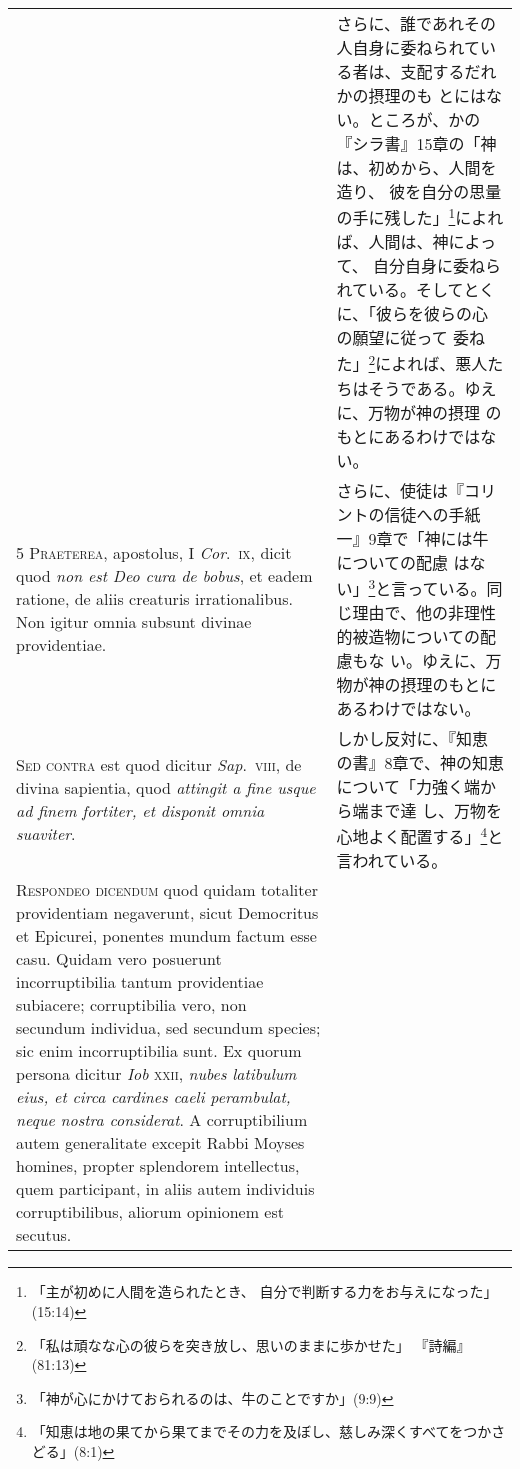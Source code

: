 \documentclass[10pt]{jsarticle} %
\begin{document}
\begin{longtable}{p{21em}p{21em}}
&

さらに、誰であれその人自身に委ねられている者は、支配するだれかの摂理のも
 とにはない。ところが、かの『シラ書』15章の「神は、初めから、人間を造り、
 彼を自分の思量の手に残した」\footnote{「主が初めに人間を造られたとき、
 自分で判断する力をお与えになった」(15:14)}によれば、人間は、神によって、
 自分自身に委ねられている。そしてとくに、「彼らを彼らの心の願望に従って
 委ねた」\footnote{「私は頑なな心の彼らを突き放し、思いのままに歩かせた」
 『詩編』(81:13)}によれば、悪人たちはそうである。ゆえに、万物が神の摂理
 のもとにあるわけではない。

\\


{\scshape 5 Praeterea}, apostolus, I {\itshape Cor}.~{\scshape ix}, dicit quod
{\itshape non est Deo cura de bobus}, et eadem ratione, de aliis creaturis
irrationalibus. Non igitur omnia subsunt divinae providentiae.

&

さらに、使徒は『コリントの信徒への手紙一』9章で「神には牛についての配慮
 はない」\footnote{「神が心にかけておられるのは、牛のことですか」(9:9)}と言っている。同じ理由で、他の非理性的被造物についての配慮もな
 い。ゆえに、万物が神の摂理のもとにあるわけではない。


\\


{\scshape Sed contra} est quod dicitur {\itshape Sap}.~{\scshape viii}, de
divina sapientia, quod {\itshape attingit a fine usque ad finem fortiter, et
disponit omnia suaviter}.

&

しかし反対に、『知恵の書』8章で、神の知恵について「力強く端から端まで達
 し、万物を心地よく配置する」\footnote{「知恵は地の果てから果てまでその力を及ぼし、慈しみ深くすべてをつかさどる」(8:1)}と言われている。

\\


{\scshape Respondeo dicendum} quod quidam totaliter
providentiam negaverunt, sicut Democritus et Epicurei, ponentes mundum
factum esse casu. Quidam vero posuerunt incorruptibilia tantum
providentiae subiacere; corruptibilia vero, non secundum individua, sed
secundum species; sic enim incorruptibilia sunt. Ex quorum persona
dicitur {\itshape Iob} {\scshape xxii}, {\itshape nubes latibulum eius, et circa cardines caeli
perambulat, neque nostra considerat}. A corruptibilium autem generalitate
excepit Rabbi Moyses homines, propter splendorem intellectus, quem
participant, in aliis autem individuis corruptibilibus, aliorum
opinionem est secutus. 




\end{longtable}
\end{document}
